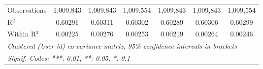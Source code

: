 \begin{table}[htbp]
\begin{threeparttable}[b]
\begin{tabular}{lcccccc}
         Observations                   & 1,009,843      & 1,009,843      & 1,009,554      & 1,009,843       & 1,009,843       & 1,009,554\\  
         R$^2$                          & 0.60291        & 0.60311        & 0.60302        & 0.60289         & 0.60306         & 0.60299\\  
         Within R$^2$                   & 0.00225        & 0.00276        & 0.00253        & 0.00219         & 0.00264         & 0.00246\\  
         \midrule \midrule
         \multicolumn{7}{l}{\emph{Clustered (User id) co-variance matrix, 95\% confidence intervals in brackets}}\\
         \multicolumn{7}{l}{\emph{Signif. Codes: ***: 0.01, **: 0.05, *: 0.1}}\\
      \end{tabular}
   \end{threeparttable}
\end{table}


